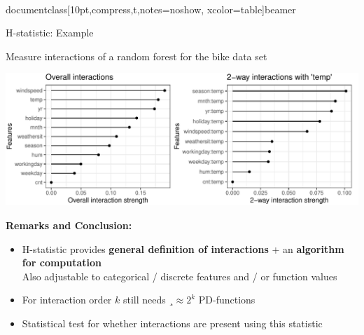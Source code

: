 \\documentclass[10pt,compress,t,notes=noshow, xcolor=table]{beamer}
\begin{document}
\begin{frame}{H-statistic: Example}

Measure interactions of a random forest for the bike data set

\begin{center}
	\includegraphics[width=\textwidth]{figure/h-statistic}
\end{center}

\pause
\textbf{Remarks and Conclusion:}
\begin{itemize}
    \item H-statistic provides \textbf{general definition of interactions} + an \textbf{algorithm for computation} \\
    Also adjustable to categorical / discrete features and / or function values
    \item For interaction order $k$ still needs $¸\approx 2^k$ PD-functions
    \item Statistical test for whether interactions are present using this statistic
\end{itemize}

\end{frame}

\endlecture
\end{document}
